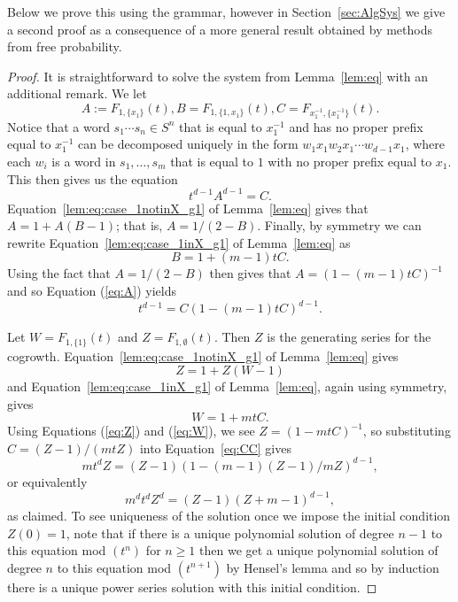 \documentclass[11pt]{amsart}
\theoremstyle{definition}
\begin{document}
Below we prove this using the grammar, however in
Section~\ref{sec:AlgSys} we give a second proof as a consequence of a more general result obtained by methods from free probability. 
\begin{proof}
It is straightforward to solve the system from Lemma~\ref{lem:eq} with
an additional remark. We let
\begin{equation}
A:=F_{1,\{x_1\}}(t), B=F_{1,\{1,x_1\}}(t), C=F_{x_1^{-1},\{x_1^{-1}\}}(t).
\end{equation}
Notice that a word $s_1\cdots s_n\in S^n$ that is equal to $x_1^{-1}$ and has no proper prefix equal to $x_1^{-1}$ can be decomposed uniquely in the form
$w_1 x_1 w_2 x_1 \cdots w_{d-1} x_1$, where each $w_i$ is a word in $s_1,\ldots ,s_m$ that is equal to $1$ with no proper prefix equal to $x_1$.  This then gives us the equation
\begin{equation}
\label{eq:A}
t^{d-1} A^{d-1} = C.
\end{equation}
Equation~\eqref{lem:eq:case_1notinX_g1} of Lemma~\ref{lem:eq} gives that 
$A=1+ A(B-1)$; that is, $A=1/(2-B)$.  Finally, by symmetry we can rewrite Equation~\eqref{lem:eq:case_1inX_g1} of Lemma~\ref{lem:eq} as
\begin{equation}
\label{eq:B}
B=1+(m-1)t C.\end{equation}
Using the fact that $A=1/(2-B)$ then gives that
$A=(1-(m-1)tC)^{-1}$ and so Equation (\ref{eq:A}) yields
\begin{equation}
\label{eq:CC}
t^{d-1} = C(1-(m-1)tC)^{d-1}.\end{equation}

Let $W=F_{1,\{1\}}(t)$ and $Z=F_{1,\emptyset}(t)$.  Then $Z$ is the generating series for the cogrowth.
Equation~\eqref{lem:eq:case_1notinX_g1} of Lemma~\ref{lem:eq} gives 
\begin{equation} \label{eq:Z}Z=1+Z(W-1)\end{equation} and Equation~\eqref{lem:eq:case_1inX_g1} of Lemma~\ref{lem:eq}, again using symmetry, gives
\begin{equation}\label{eq:W}
W=1+mt C.
\end{equation}
Using Equations (\ref{eq:Z}) and (\ref{eq:W}), we see $Z=(1-mtC)^{-1}$, so substituting $C=(Z-1)/(mtZ)$ into Equation~\ref{eq:CC} gives
$$mt^{d}Z = (Z-1)(1-(m-1)(Z-1)/mZ)^{d-1},$$ or equivalently
$$m^d t^d Z^d = (Z-1)(Z+m-1)^{d-1},$$ as claimed.  To see uniqueness of the solution once we impose the initial condition $Z(0)=1$, note that if there is a unique polynomial solution of degree $n-1$ to this equation mod $(t^n)$ for $n\ge 1$ then we get a unique polynomial solution of degree $n$ to this equation mod $(t^{n+1})$ by Hensel's lemma and so by induction there is a unique power series solution with this initial condition.
\end{proof}
\end{document}
